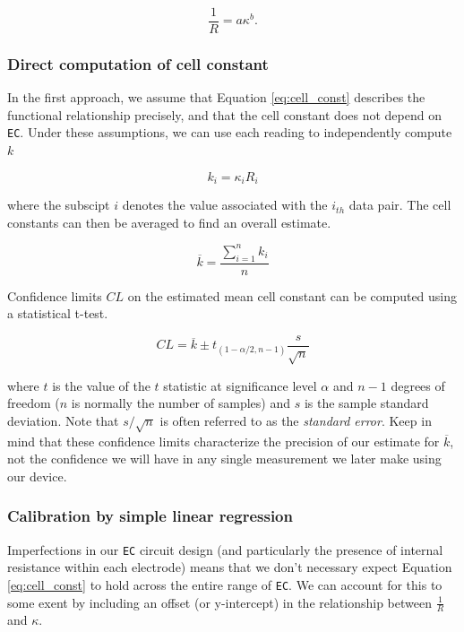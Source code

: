 \begin{equation}\label{eq:ec_power}
	\frac{1}{R}=a\kappa ^b.  
\end{equation}

\subsubsection{Direct computation of cell constant}
In the first approach, we assume that Equation \ref{eq:cell_const} describes the functional relationship precisely, and that the cell constant does not depend on \texttt{EC}.  Under these assumptions, we can use each reading to independently compute $k$

\begin{equation}\label{eq:cell_i}
	k_i=\kappa _i R_i  
\end{equation}

where the subscipt $i$ denotes the value associated with the ${i_{th}}$ data pair.  The cell constants can then be averaged to find an overall estimate. 

\begin{equation}\label{eq:ave_cell_const}
	\overline{k} = \frac{\sum\limits_{i=1}^n k_i}{n}
\end{equation}

Confidence limits $CL$ on the estimated mean cell constant can be computed using a statistical t-test. 

\begin{equation}\label{eq:ec_power}
	CL = \overline{k} \pm t_{({1-\alpha/2,n-1})}\frac{s}{\sqrt{n}}
\end{equation}

where $t$ is the value of the $t$ statistic at significance level $\alpha$ and $n-1$ degrees of freedom ($n$ is normally the number of samples) and $s$ is the sample standard deviation. Note that $s/\sqrt{n}$ is often referred to as the \emph{standard error}.  Keep in mind that these confidence limits characterize the precision of our estimate for $\overline{k}$, not the confidence we will have in any single measurement we later make using our device.
 
\subsubsection{Calibration by simple linear regression}

Imperfections in our \texttt{EC} circuit design (and particularly the presence of internal resistance within each electrode) means that we don't necessary expect Equation \ref{eq:cell_const} to hold across the entire range of \texttt{EC}. We can account for this to some exent by including an offset (or y-intercept) in the relationship between $\frac{1}{R}$ and $\kappa$.

